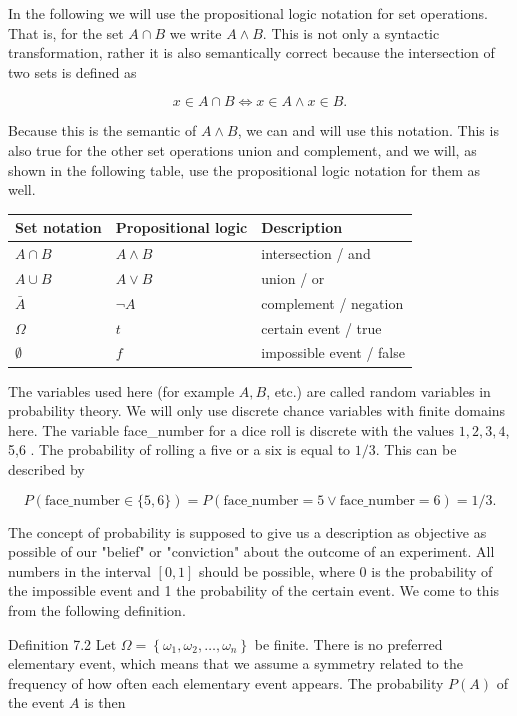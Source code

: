 \documentclass[10pt]{book}
\begin{document}
In the following we will use the propositional logic notation for set operations. That is, for the set $A \cap B$ we write $A \wedge B$. This is not only a syntactic transformation, rather it is also semantically correct because the intersection of two sets is defined as

$$
x \in A \cap B \Leftrightarrow x \in A \wedge x \in B .
$$

Because this is the semantic of $A \wedge B$, we can and will use this notation. This is also true for the other set operations union and complement, and we will, as shown in the following table, use the propositional logic notation for them as well.

\begin{center}
\begin{tabular}{|l|l|l|}
\hline
Set notation & Propositional logic & Description \\
\hline
$A \cap B$ & $A \wedge B$ & intersection / and \\
\hline
$A \cup B$ & $A \vee B$ & union / or \\
\hline
$\bar{A}$ & $\neg A$ & complement / negation \\
\hline
$\Omega$ & $t$ & certain event / true \\
\hline
$\emptyset$ & $f$ & impossible event / false \\
\hline
\end{tabular}
\end{center}

The variables used here (for example $A, B$, etc.) are called random variables in probability theory. We will only use discrete chance variables with finite domains here. The variable face\_number for a dice roll is discrete with the values $1,2,3,4$, 5,6 . The probability of rolling a five or a six is equal to $1 / 3$. This can be described by

$$
P(\text{face\_number} \in\{5,6\})=P(\text{face\_number}=5 \vee \text{face\_number}=6)=1 / 3 .
$$

The concept of probability is supposed to give us a description as objective as possible of our "belief" or "conviction" about the outcome of an experiment. All numbers in the interval $[0,1]$ should be possible, where 0 is the probability of the impossible event and 1 the probability of the certain event. We come to this from the following definition.

Definition 7.2 Let $\Omega=\left\{\omega_{1}, \omega_{2}, \ldots, \omega_{n}\right\}$ be finite. There is no preferred elementary event, which means that we assume a symmetry related to the frequency of how often each elementary event appears. The probability $P(A)$ of the event $A$ is then
\end{document}
